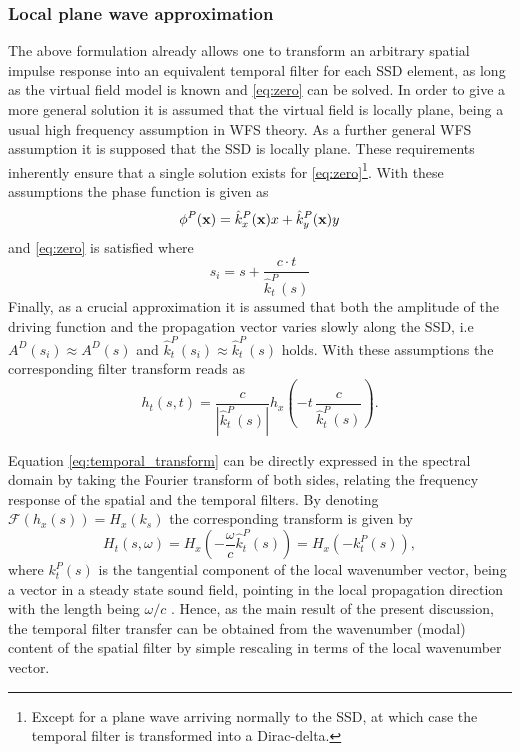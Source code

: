\documentclass[conference]{IEEEtran}
\begin{document}
\subsubsection{Local plane wave approximation}
The above formulation already allows one to transform an arbitrary spatial impulse response into an equivalent temporal filter for each SSD element, as long as the virtual field model is known and \eqref{eq:zero} can be solved.
In order to give a more general solution it is assumed that the virtual field is locally plane, being a usual high frequency assumption in WFS theory. 
As a further general WFS assumption it is supposed that the SSD is locally plane.
These requirements inherently ensure that a single solution exists for \eqref{eq:zero}\footnote{Except for a plane wave arriving normally to the SSD, at which case the temporal filter is transformed into a Dirac-delta.}.
With these assumptions the phase function is given as
\begin{equation}
\phi^P(\mathbf{x}) = \hat{k}^P_x(\mathbf{x})x +  \hat{k}^P_y(\mathbf{x}) y 
\end{equation}
and \eqref{eq:zero} is satisfied where 
\begin{equation}
    s_i = s + \frac{c \cdot t}{\hat{k}_t^P(s)}
\end{equation}
Finally, as a crucial approximation it is assumed that both the amplitude of the driving function and the propagation vector varies slowly along the SSD, i.e $A^D(s_i) \approx A^D(s)$ and $\hat{k}_t^P(s_i) \approx \hat{k}_t^P(s)$ holds.
With these assumptions the corresponding filter transform reads as
\begin{equation}
    h_t\left(s,t\right) =\frac{ c }{|\hat{k}_t^P(s)|} h_x\left(-t \,\frac{c}{\hat{k}_t^P(s)}\right).
    \label{eq:temporal_transform}
\end{equation}

Equation \eqref{eq:temporal_transform} can be directly expressed in the spectral domain by taking the Fourier transform of both sides, relating the frequency response of the spatial and the temporal filters. 
By denoting $\mathcal{F}\left( h_x(s)\right) = H_x(k_s)$ the corresponding transform is given by
\begin{equation}
    H_t\left(s,\omega\right) = H_x\left(-\frac{\omega}{c}\hat{k}_t^P(s)\right) = H_x\left(-k_t^P(s)\right),
    \label{eq:frequency_transform}
\end{equation}
where $k_t^P(s)$ is the tangential component of the local wavenumber vector, being a vector in a steady state sound field, pointing in the local propagation direction with the length being $\omega/c$ \cite{Firtha2019phd}.
Hence, as the main result of the present discussion, the temporal filter transfer can be obtained from the wavenumber (modal) content of the spatial filter by simple rescaling in terms of the local wavenumber vector.
\end{document}
